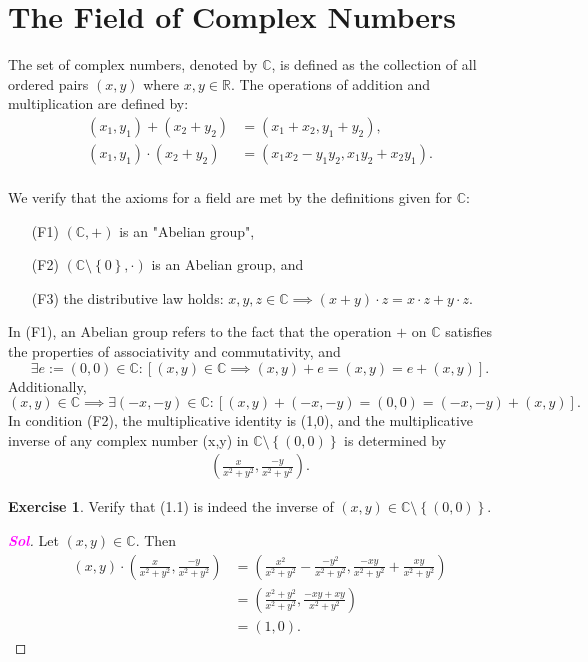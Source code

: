 \documentclass[12pt,openany]{book}
\theoremstyle{definition}
\newtheorem{exercise}{Exercise}[section]
\newcommand{\set}[1]{\left\{#1\right\}}
\newcommand{\R}{\mathbb{R}}
\newcommand{\C}{\mathbb{C}}
\newcommand{\of}[1]{\left( #1 \right)}
\newcommand{\sol}{\textcolor{magenta}{\bf Sol}}
\begin{document}
	\newpage
	\section{The Field of Complex Numbers}
	
	The set of complex numbers, denoted by $\C$, is defined as the collection of all ordered pairs $(x,y)$ where $x,y\in\R$. The operations of addition and multiplication are defined by:\begin{align*}
		(x_1,y_1)+(x_2+y_2)&=(x_1+x_2,y_1+y_2),\\
		(x_1,y_1)\cdot(x_2+y_2)&=(x_1x_2-y_1y_2,x_1y_2+x_2y_1).\\
	\end{align*}
	
	We verify that the axioms for a field are met by the definitions given for $\C$: \begin{itemize}
		\item[(F1)] $\of{\C,+}$ is an "Abelian group",
		\item[(F2)] $\of{\C\setminus\set{0},\cdot}$ is an Abelian group, and
		\item[(F3)] the distributive law holds: $x,y,z\in\C\implies\of{x+y}\cdot z=x\cdot z+y\cdot z$.
	\end{itemize}

	In (F1), an Abelian group refers to the fact that the operation $+$ on $\C$ satisfies the properties of associativity and commutativity, and \[
	\exists e:=(0,0)\in\C:[(x,y)\in\C\implies(x,y)+e=(x,y)=e+(x,y)].
	\] Additionally, \[
	(x,y)\in\C\implies\exists(-x,-y)\in\C:[(x,y)+(-x,-y)=(0,0)=(-x,-y)+(x,y)].
	\] In condition (F2), the multiplicative identity is (1,0), and the multiplicative inverse of any complex number (x,y) in $\C\setminus\set{(0,0)}$ is determined by \begin{align}
		\of{\frac{x}{x^2+y^2},\frac{-y}{x^2+y^2}}.
	\end{align}
	
	\begin{exercise}
		Verify that (1.1) is indeed the inverse of $(x,y)\in\C\setminus\set{(0,0)}$.
		\begin{proof}[\sol]
			Let $(x,y)\in\C$. Then \begin{align*}
			(x,y)\cdot\of{\frac{x}{x^2+y^2},\frac{-y}{x^2+y^2}}
			&=\of{\frac{x^2}{x^2+y^2}-\frac{-y^2}{x^2+y^2},\frac{-xy}{x^2+y^2}+\frac{xy}{x^2+y^2}}\\
			&=\of{\frac{x^2+y^2}{x^2+y^2},\frac{-xy+xy}{x^2+y^2}}\\
			&=(1,0).
			\end{align*}
		\end{proof}
	\end{exercise}
\end{document}

